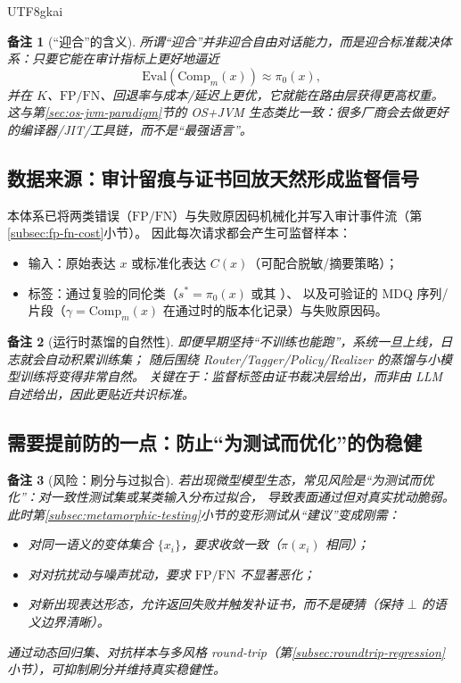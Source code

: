 \documentclass[12pt]{article}
\newtheorem{remark}{备注}[section]
\newcommand{\code}[1]{\path{#1}}
\begin{document}
\begin{CJK*}{UTF8}{gkai}
\begin{remark}[“迎合”的含义]
所谓“迎合”并非迎合自由对话能力，而是迎合标准裁决体系：只要它能在审计指标上更好地逼近
\[
\mathrm{Eval}(\mathrm{Comp}_m(x))\approx \pi_0(x),
\]
并在 $K$、$\mathrm{FP}/\mathrm{FN}$、回退率与成本/延迟上更优，它就能在路由层获得更高权重。
这与第\ref{sec:os-jvm-paradigm}节的 OS+JVM 生态类比一致：很多厂商会去做更好的编译器/JIT/工具链，而不是“最强语言”。
\end{remark}

\subsection{数据来源：审计留痕与证书回放天然形成监督信号}
\label{subsec:micro-model-data}

本体系已将两类错误（$\mathrm{FP}/\mathrm{FN}$）与失败原因码机械化并写入审计事件流（第\ref{subsec:fp-fn-cost}小节）。
因此每次请求都会产生可监督样本：
\begin{itemize}
  \item 输入：原始表达 $x$ 或标准化表达 $C(x)$（可配合脱敏/摘要策略）；
  \item 标签：通过复验的同伦类（$s^\ast=\pi_0(x)$ 或其 \code{class_id}）、
  以及可验证的 MDQ 序列/片段（$\gamma=\mathrm{Comp}_m(x)$ 在通过时的版本化记录）与失败原因码。
\end{itemize}

\begin{remark}[运行时蒸馏的自然性]
即便早期坚持“不训练也能跑”，系统一旦上线，日志就会自动积累训练集；
随后围绕 Router/Tagger/Policy/Realizer 的蒸馏与小模型训练将变得非常自然。
关键在于：监督标签由证书裁决层给出，而非由 LLM 自述给出，因此更贴近共识标准。
\end{remark}

\subsection{需要提前防的一点：防止“为测试而优化”的伪稳健}
\label{subsec:anti-gaming}

\begin{remark}[风险：刷分与过拟合]
若出现微型模型生态，常见风险是“为测试而优化”：对一致性测试集或某类输入分布过拟合，
导致表面通过但对真实扰动脆弱。此时第\ref{subsec:metamorphic-testing}小节的变形测试从“建议”变成刚需：
\begin{itemize}
  \item 对同一语义的变体集合 $\{x_i\}$，要求收敛一致（$\pi(x_i)$ 相同）；
  \item 对对抗扰动与噪声扰动，要求 $\mathrm{FP}/\mathrm{FN}$ 不显著恶化；
  \item 对新出现表达形态，允许返回失败并触发补证书，而不是硬猜（保持 $\bot$ 的语义边界清晰）。
\end{itemize}
通过动态回归集、对抗样本与多风格 round-trip（第\ref{subsec:roundtrip-regression}小节），可抑制刷分并维持真实稳健性。
\end{remark}


\end{CJK*}
\end{document}
